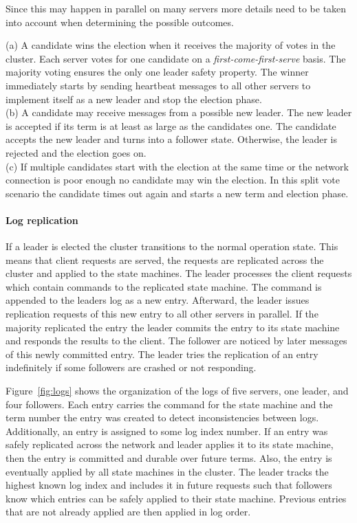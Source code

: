 Since this may happen in parallel on many servers more details
need to be taken into account when determining the possible outcomes.

(a) A candidate wins the election when it receives the majority of
votes in the cluster. Each server votes for one candidate on a
\textit{first-come-first-serve} basis. The majority voting ensures
the only one leader safety property. The winner immediately starts
by sending heartbeat messages to all other servers to implement itself
as a new leader and stop the election phase.~\cite{ongaro2014consensus}\\
(b) A candidate may receive messages from a possible new leader.
The new leader is accepted if its term is at least as large as
the candidates one. The candidate accepts the new leader and turns
into a follower state. Otherwise, the leader is rejected and the election
goes on.~\cite{ongaro2014consensus}\\
(c) If multiple candidates start with the election at the same
time or the network connection is poor enough no candidate may win
the election. In this split vote scenario the candidate times out again
and starts a new term and election phase.\cite{ongaro2014consensus}

\paragraph{Log replication}
If a leader is elected the cluster transitions to the normal operation
state. This means that client requests are served, the requests are
replicated across the cluster and applied to the state machines.
The leader processes the client requests which contain commands to
the replicated state machine. The command is appended to the leaders
log as a new entry. Afterward, the leader issues replication requests
of this new entry to all other servers in parallel. If the majority
replicated the entry the leader commits the entry to its state machine
and responds the results to the client. The follower are noticed by
later messages of this newly committed entry. The leader
tries the replication of an entry indefinitely if some followers
are crashed or not responding.~\cite{ongaro2014search}

Figure~\ref{fig:logs} shows the organization of the logs of five servers,
one leader, and four followers. Each entry carries the command for the state
machine and the term number the entry was created to detect inconsistencies
between logs. Additionally, an entry is assigned to some log index number.
If an entry was safely replicated across the network and leader applies
it to its state machine, then the entry is committed and durable over
future terms. Also, the entry is eventually applied by all state machines
in the cluster. The leader tracks the highest known log index and includes
it in future requests such that followers know which entries can be
safely applied to their state machine. Previous entries that are
not already applied are then applied in log order.~\cite{ongaro2014consensus}

